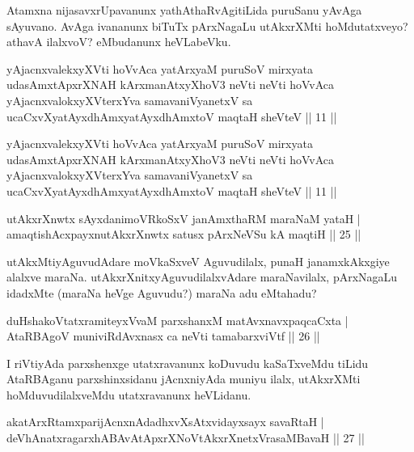 \begin{artha}
Atamxna nijasavxrUpavanunx yathAthaRvAgitiLida puruSanu yAvAga sAyuvano. AvAga ivananunx 
biTuTx pArxNagaLu utAkxrXMti hoMdutatxveyo? athavA ilalxvoV? eMbudanunx heVLabeVku.
\end{artha}


\begin{kandikeshl}
yAjacnxvalekxyXVti hoVvAca yatArxyaM puruSoV mirxyata udasAmxtApxrXNAH kArxmanAtxyXhoV3 neVti neVti hoVvAca yAjacnxvalokxyXV\s terxYva samavaniVyanetxV sa ucaCxvXyatAyxdhAmxyatAyxdhAmxtoV maqtaH sheVteV || 11 ||
\end{kandikeshl}


\begin{shl}
yAjacnxvalekxyXVti hoVvAca yatArxyaM puruSoV mirxyata udasAmxtApxrXNAH kArxmanAtxyXhoV3 neVti neVti hoVvAca yAjacnxvalokxyXV\s terxYva samavaniVyanetxV sa ucaCxvXyatAyxdhAmxyatAyxdhAmxtoV maqtaH sheVteV || 11 ||
\end{shl}


\begin{shl}
utAkxrXnwtx sAyxdanimoVRkoSxV janAmxthaRM maraNaM yataH |\\
amaqtishAcxpayxnutAkxrXnwtx satusx pArxNeVSu kA maqtiH \hfill || 25 ||
\end{shl}

\begin{artha}
utAkxMtiyAguvudAdare moVkaSxveV Aguvudilalx, punaH janamxkAkxgiye alalxve maraNa. 
utAkxrXnitxyAguvudilalxvAdare maraNavilalx, pArxNagaLu idadxMte (maraNa heVge Aguvudu?) 
maraNa adu eMtahadu?
\end{artha}

\begin{shl}
duHshakoVtatxramiteyxVvaM parxshanxM matAvx\s navxpaqcaCxta |\\
AtaRBAgoV muniviRdAvxnasx ca neVti tamabarxviVtf \hfill || 26 ||
\end{shl}

\begin{artha}
I riVtiyAda parxshenxge utatxravanunx koDuvudu kaSaTxveMdu tiLidu AtaRBAganu 
parxshinxsidanu jAcnxniyAda muniyu ilalx, utAkxrXMti hoMduvudilalxveMdu utatxravanunx 
heVLidanu.
\end{artha}

\begin{shl}
akatArxRtamxparijAcnxnAdadhxvXsAtxvidayxsayx savaRtaH |\\
deVhAnatxragarxhABAvAtApxrXNoVtAkxrXnetxVrasaMBavaH \hfill || 27 ||
\end{shl}

